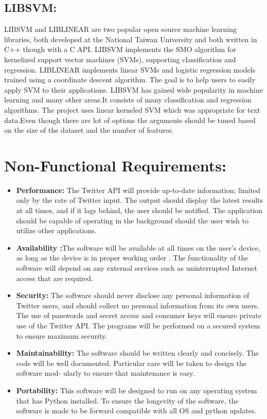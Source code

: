 \subsection{LIBSVM:}
LIBSVM and LIBLINEAR are two popular open source machine learning libraries, both developed at the National Taiwan University and both written in C++ though with a C API. LIBSVM implements the SMO algorithm for kernelized support vector machines (SVMs), supporting classification and regression. LIBLINEAR implements linear SVMs and logistic regression models trained using a coordinate descent algorithm. The goal is to help users to easily apply SVM to their applications. LIBSVM has gained wide popularity in machine learning and many other areas.It consists of many classification and regression algorithms.
The project uses linear kerneled SVM which was appropriate for text data.Even though there are lot of options the arguments should be tuned based on the size of the dataset and the number of features.
\section{Non-Functional Requirements:}
\begin{itemize}
\item \textbf{Performance:} The Twitter API will provide up-to-date information; limited only
by the rate of Twitter input.
The output should display the latest results at all times, and if it lags behind,
the user should be notified. The application should be capable of operating in the
background should the user wish to utilize other applications.

\item \textbf{Availability :}The software will be available at all times on the user’s device, as
long as the device is in proper working order . The functionality of the software
will depend on any external services such as uninterrupted Internet access that are
required.
\item \textbf{Security:} The software should never disclose any personal information of Twitter
users, and should collect no personal information from its own users. The use of
passwords and secret access and consumer keys will ensure private use of the Twitter API. The programs will be performed on a secured system to ensure maximum
security.
\item \textbf{ Maintainability:} The software should be written clearly and concisely. The code
will be well documented. Particular care will be taken to design the software mod-
ularly to ensure that maintenance is easy.
\item \textbf{Portability:} This software will be designed to run on any operating system that
has Python installed. To ensure the longevity of the software, the software is made
to be forward compatible with all OS and python updates.
\end{itemize}
